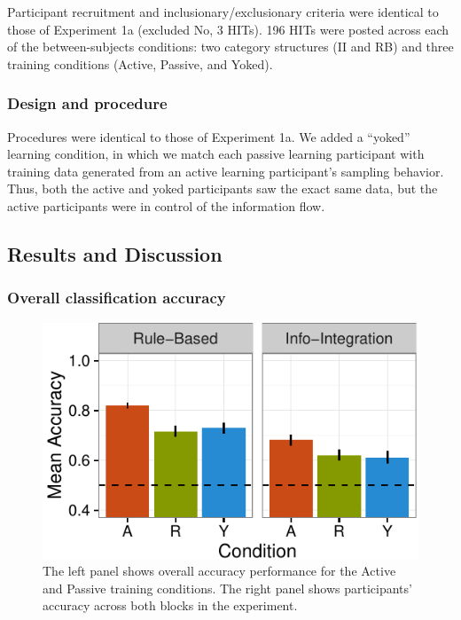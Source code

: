 \documentclass[10pt, letterpaper]{article}
\newenvironment{CodeChunk}{}{}
\begin{document}
Participant recruitment and inclusionary/exclusionary criteria were
identical to those of Experiment 1a (excluded No, 3 HITs). 196 HITs were
posted across each of the between-subjects conditions: two category
structures (II and RB) and three training conditions (Active, Passive,
and Yoked).

\subsubsection{Design and procedure}\label{design-and-procedure-1}

Procedures were identical to those of Experiment 1a. We added a
``yoked'' learning condition, in which we match each passive learning
participant with training data generated from an active learning
participant's sampling behavior. Thus, both the active and yoked
participants saw the exact same data, but the active participants were
in control of the information flow.

\subsection{Results and Discussion}\label{results-and-discussion-1}

\subsubsection{Overall classification
accuracy}\label{overall-classification-accuracy-1}

\begin{CodeChunk}
\captionsetup{width=0.8\columnwidth}\begin{figure}[t]

{\centering \includegraphics{figs/rep1b-acc-plot-1} 

}

\caption[The left panel shows overall accuracy performance for the Active and Passive training conditions]{The left panel shows overall accuracy performance for the Active and Passive training conditions. The right panel shows participants' accuracy across both blocks in the experiment.}\label{fig:rep1b-acc-plot}
\end{figure}
\end{CodeChunk}
\end{document}
